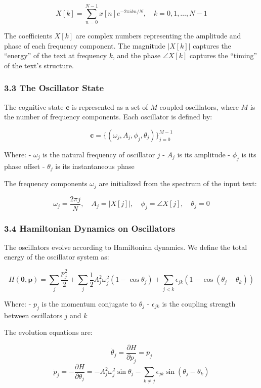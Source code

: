 \documentclass[
  11pt,
  a4paper,
]{article}
\begin{document}
\[
X[k] = \sum_{n=0}^{N-1} x[n] e^{-2\pi i k n / N}, \quad k = 0, 1, \dots, N-1
\]

The coefficients \(X[k]\) are complex numbers representing the amplitude
and phase of each frequency component. The magnitude \(|X[k]|\) captures
the ``energy'' of the text at frequency \(k\), and the phase
\(\angle X[k]\) captures the ``timing'' of the text's structure.

\subsubsection{3.3 The Oscillator State}\label{the-oscillator-state}

The cognitive state \(\mathbf{c}\) is represented as a set of \(M\)
coupled oscillators, where \(M\) is the number of frequency components.
Each oscillator is defined by:

\[
\mathbf{c} = \{ (\omega_j, A_j, \phi_j, \theta_j) \}_{j=0}^{M-1}
\]

Where: - \(\omega_j\) is the natural frequency of oscillator \(j\) -
\(A_j\) is its amplitude - \(\phi_j\) is its phase offset - \(\theta_j\)
is its instantaneous phase

The frequency components \(\omega_j\) are initialized from the spectrum
of the input text:

\[
\omega_j = \frac{2\pi j}{N}, \quad A_j = |X[j]|, \quad \phi_j = \angle X[j], \quad \theta_j = 0
\]

\subsubsection{3.4 Hamiltonian Dynamics on
Oscillators}\label{hamiltonian-dynamics-on-oscillators}

The oscillators evolve according to Hamiltonian dynamics. We define the
total energy of the oscillator system as:

\[
H(\boldsymbol{\theta}, \mathbf{p}) = \sum_j \frac{p_j^2}{2} + \sum_j \frac{1}{2} A_j^2 \omega_j^2 (1 - \cos \theta_j) + \sum_{j < k} \epsilon_{jk} (1 - \cos(\theta_j - \theta_k))
\]

Where: - \(p_j\) is the momentum conjugate to \(\theta_j\) -
\(\epsilon_{jk}\) is the coupling strength between oscillators \(j\) and
\(k\)

The evolution equations are:

\[
\dot{\theta}_j = \frac{\partial H}{\partial p_j} = p_j
\] \[
\dot{p}_j = -\frac{\partial H}{\partial \theta_j} = -A_j^2 \omega_j^2 \sin \theta_j - \sum_{k \neq j} \epsilon_{jk} \sin(\theta_j - \theta_k)
\]
\end{document}
